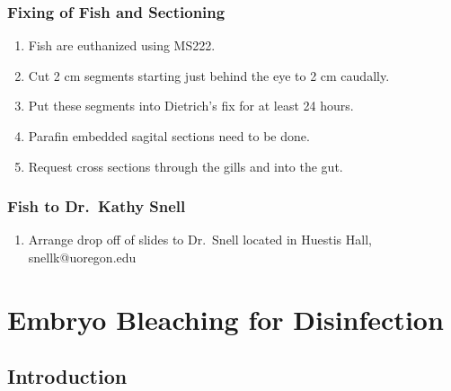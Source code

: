 \documentclass[
  letterpaper,
  DIV=11,
  numbers=noendperiod]{scrreprt}
\providecommand{\tightlist}{%
  \setlength{\itemsep}{0pt}\setlength{\parskip}{0pt}}\usepackage{longtable,booktabs,array}
\begin{document}
\hypertarget{fixing-of-fish-and-sectioning}{%
\subsection{Fixing of Fish and
Sectioning}\label{fixing-of-fish-and-sectioning}}

\begin{enumerate}
\def\labelenumi{\arabic{enumi}.}
\tightlist
\item
  Fish are euthanized using MS222.
\item
  Cut 2 cm segments starting just behind the eye to 2 cm caudally.
\item
  Put these segments into Dietrich's fix for at least 24 hours.
\item
  Parafin embedded sagital sections need to be done.
\item
  Request cross sections through the gills and into the gut.
\end{enumerate}

\hypertarget{fish-to-dr.-kathy-snell}{%
\subsection{Fish to Dr.~Kathy Snell}\label{fish-to-dr.-kathy-snell}}

\begin{enumerate}
\def\labelenumi{\arabic{enumi}.}
\tightlist
\item
  Arrange drop off of slides to Dr.~Snell located in Huestis Hall,
  snellk@uoregon.edu
\end{enumerate}

\hypertarget{sec-husbandry_stickleback_embryo_bleaching}{%
\chapter{Embryo Bleaching for
Disinfection}\label{sec-husbandry_stickleback_embryo_bleaching}}

\hypertarget{introduction-31}{%
\section{Introduction}\label{introduction-31}}
\end{document}
